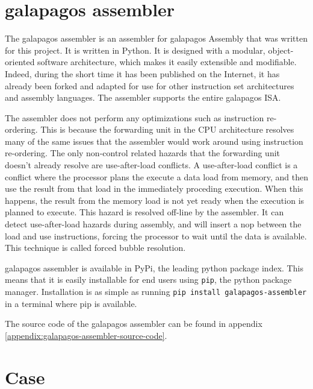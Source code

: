 \section{\Gls{galapagos assembler}}

The \Gls{galapagos assembler} is an assembler for \Gls{galapagos} Assembly that was written for this project.
It is written in Python. 
It is designed with a modular, object-oriented software architecture, which makes it easily extensible and modifiable.
Indeed, during the short time it has been published on the Internet, it has already been forked and adapted for use for other instruction set architectures and assembly languages.\cn {}
The assembler supports the entire \Gls{galapagos} ISA.

The assembler does not perform any optimizations such as instruction re-ordering.
This is because the forwarding unit in the CPU architecture resolves many of the same issues that the assembler would work around using instruction re-ordering. 
The only non-control related hazards that the forwarding unit doesn't already resolve  are use-after-load conflicts.
A use-after-load conflict is a conflict where the processor plans the execute a data load from memory, and then use the result from that load in the immediately proceding execution.
When this happens, the result from the memory load is not yet ready when the execution is planned to execute.
This hazard is resolved off-line by the assembler.
It can detect use-after-load hazards during assembly, and will insert a \gls{nop} between the load and use instructions, forcing the processor to wait until the data is available.
This technique is called forced bubble resolution.\cn


\Gls{galapagos assembler} is available in PyPi, the leading python package index.
This means that it is easily installable for end users using \texttt{pip}, the python package manager.
Installation is as simple as running \texttt{pip install galapagos-assembler} in a terminal where pip is available.

The source code of the \Gls{galapagos assembler} can be found in appendix \vref{appendix:galapagos-assembler-source-code}.

\section{Case}

